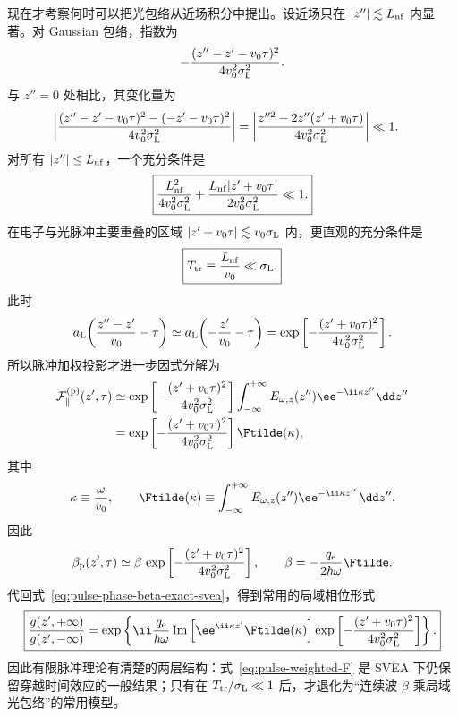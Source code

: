 现在才考察何时可以把光包络从近场积分中提出。设近场只在 $|z''|\lesssim L_{\rm nf}$ 内显著。对 Gaussian 包络，指数为
\begin{equation}
-\frac{(z''-z'-v_0\tau)^2}{4v_0^2\sigma_{\rm L}^2}.
\end{equation}
与 $z''=0$ 处相比，其变化量为
\begin{align}
 \left|
 \frac{(z''-z'-v_0\tau)^2-(-z'-v_0\tau)^2}
 {4v_0^2\sigma_{\rm L}^2}
 \right|
 &=\left|
 \frac{z''^2-2z''(z'+v_0\tau)}
 {4v_0^2\sigma_{\rm L}^2}
 \right|\ll1.
 \label{eq:pulse-freeze-exact}
\end{align}
对所有 $|z''|\le L_{\rm nf}$，一个充分条件是
\begin{equation}
 \boxed{
 \frac{L_{\rm nf}^2}{4v_0^2\sigma_{\rm L}^2}
 +\frac{L_{\rm nf}|z'+v_0\tau|}{2v_0^2\sigma_{\rm L}^2}
 \ll1.}
 \label{eq:pulse-freeze-condition}
\end{equation}
在电子与光脉冲主要重叠的区域 $|z'+v_0\tau|\lesssim v_0\sigma_{\rm L}$ 内，更直观的充分条件是
\begin{equation}
 \boxed{
 T_{\rm tr}\equiv\frac{L_{\rm nf}}{v_0}\ll\sigma_{\rm L}.}
 \label{eq:transit-condition}
\end{equation}
此时
\begin{equation}
 a_{\rm L}\!\left(\frac{z''-z'}{v_0}-\tau\right)
\simeq
 a_{\rm L}\!\left(-\frac{z'}{v_0}-\tau\right)
=
\exp\left[-\frac{(z'+v_0\tau)^2}{4v_0^2\sigma_{\rm L}^2}\right].
\label{eq:pulse-freeze}
\end{equation}
所以脉冲加权投影才进一步因式分解为
\begin{align}
\mathcal F_{\parallel}^{({\rm p})}(z',\tau)
&\simeq
\exp\left[-\frac{(z'+v_0\tau)^2}{4v_0^2\sigma_{\rm L}^2}\right]
\int_{-\infty}^{+\infty}
E_{\omega,z}(z'')\ee^{-\ii\kappa z''}\dd z''\\
&=
\exp\left[-\frac{(z'+v_0\tau)^2}{4v_0^2\sigma_{\rm L}^2}\right]
\Ftilde(\kappa),
\label{eq:pulse-F-factorization}
\end{align}
其中
\begin{equation}
 \kappa\equiv\frac{\omega}{v_0},
 \qquad
 \Ftilde(\kappa)
 \equiv\int_{-\infty}^{+\infty}
 E_{\omega,z}(z'')\ee^{-\ii\kappa z''}\,\dd z''.
 \label{eq:Fdef}
\end{equation}
因此
\begin{equation}
\beta_{\rm p}(z',\tau)
\simeq
\beta\,
\exp\left[-\frac{(z'+v_0\tau)^2}{4v_0^2\sigma_{\rm L}^2}\right],
\qquad
\beta=-\frac{q_{\rm e}}{2\hbar\omega}\Ftilde.
\label{eq:pulse-beta-factorization}
\end{equation}
代回式~\eqref{eq:pulse-phase-beta-exact-svea}，得到常用的局域相位形式
\begin{equation}
 \boxed{
 \frac{g(z',+\infty)}{g(z',-\infty)}
 =\exp\left\{
 \ii\frac{q_{\rm e}}{\hbar\omega}
 \operatorname{Im}\left[
 \ee^{\ii\kappa z'}\Ftilde(\kappa)
 \right]
 \exp\left[-\frac{(z'+v_0\tau)^2}{4v_0^2\sigma_{\rm L}^2}\right]
 \right\}.}
 \label{eq:phase-final}
\end{equation}
因此有限脉冲理论有清楚的两层结构：式~\eqref{eq:pulse-weighted-F} 是 SVEA 下仍保留穿越时间效应的一般结果；只有在 $T_{\rm tr}/\sigma_{\rm L}\ll1$ 后，才退化为“连续波 $\beta$ 乘局域光包络”的常用模型。


